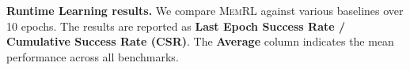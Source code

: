 \documentclass{article}
\theoremstyle{plain}
\theoremstyle{definition}
\theoremstyle{remark}
\begin{document}
\begin{table}[t]
\centering
\footnotesize 
\setlength{\tabcolsep}{3pt} 
\setlength{\abovecaptionskip}{3pt}

\caption{\textbf{Runtime Learning results.} We compare \textsc{MemRL} against various baselines over 10 epochs. The results are reported as \textbf{Last Epoch Success Rate / Cumulative Success Rate (CSR)}. The \textbf{Average} column indicates the mean performance across all benchmarks.}
\label{tab:runtime_main_results}


\end{table}
\end{document}
